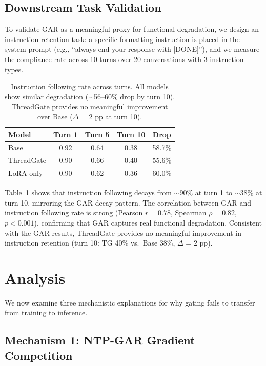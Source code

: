 \documentclass[11pt,a4paper]{article}
\begin{document}
\subsection{Downstream Task Validation}

To validate GAR as a meaningful proxy for functional degradation, we design an instruction retention task: a specific formatting instruction is placed in the system prompt (e.g., ``always end your response with [DONE]''), and we measure the compliance rate across 10 turns over 20 conversations with 3 instruction types.

\begin{table}[t]
\centering
\caption{Instruction following rate across turns. All models show similar degradation ($\sim$56--60\% drop by turn 10). ThreadGate provides no meaningful improvement over Base ($\Delta$ = 2 pp at turn 10).}
\label{tab:downstream}
\begin{tabular}{lcccc}
\toprule
\textbf{Model} & \textbf{Turn 1} & \textbf{Turn 5} & \textbf{Turn 10} & \textbf{Drop} \\
\midrule
Base       & 0.92 & 0.64 & 0.38 & 58.7\% \\
ThreadGate & 0.90 & 0.66 & 0.40 & 55.6\% \\
LoRA-only  & 0.90 & 0.62 & 0.36 & 60.0\% \\
\bottomrule
\end{tabular}
\end{table}

Table~\ref{tab:downstream} shows that instruction following decays from $\sim$90\% at turn 1 to $\sim$38\% at turn 10, mirroring the GAR decay pattern.
The correlation between GAR and instruction following rate is strong (Pearson $r = 0.78$, Spearman $\rho = 0.82$, $p < 0.001$), confirming that GAR captures real functional degradation.
Consistent with the GAR results, ThreadGate provides no meaningful improvement in instruction retention (turn 10: TG 40\% vs.\ Base 38\%, $\Delta$ = 2 pp).


\section{Analysis}

We now examine three mechanistic explanations for why gating fails to transfer from training to inference.

\subsection{Mechanism 1: NTP-GAR Gradient Competition}
\end{document}
